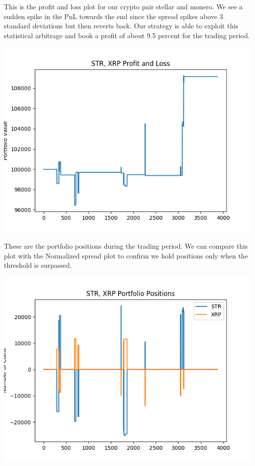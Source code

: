 \documentclass[12pt, letterpaper]{article}
\begin{document}
This is the profit and loss plot for our crypto pair stellar and monero. We see a sudden spike in the PnL towards the end since the spread spikes above 3 standard deviations but then reverts back. Our strategy is able to exploit this statistical arbitrage and book a profit of about 9.5 percent for the trading period.
\begin{center}
	\includegraphics[scale=.5]{p&l_z2.png}
\end{center}
These are the portfolio positions during the trading period. We can compare this plot with the Normalized spread plot to confirm we hold positions only when the threshold is surpassed.
\begin{center}
	\includegraphics[scale=.5]{portfolio_z2.png}
\end{center}
	
\end{document}

